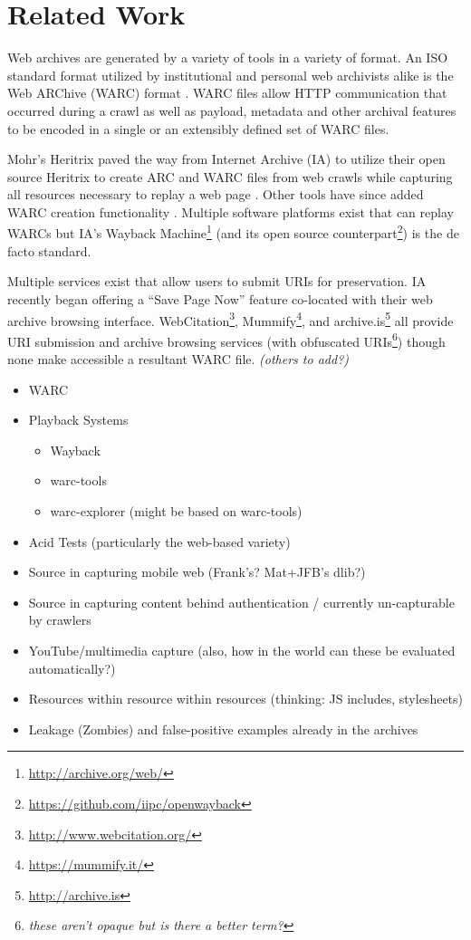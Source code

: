 \documentclass{acm_proc}
\newcommand{\todo}[1]{{\textit{\color{red}#1}}}
\begin{document}
\section{Related Work}


Web archives are generated by a variety of tools in a variety of format. An ISO standard format utilized by institutional and personal web archivists alike is the Web ARChive (WARC) format \cite{isowarc}. WARC files allow HTTP communication that occurred during a crawl as well as payload, metadata and other archival features to be encoded in a single or an extensibly defined set of WARC files.

Mohr's Heritrix paved the way from Internet Archive (IA) to utilize their open source Heritrix to create ARC and WARC files from web crawls while capturing all resources necessary to replay a web page \cite{Heritrix}. Other tools have since added WARC creation functionality \cite{wget-warc,kelly-jcdl2012,warc-proxy}. Multiple software platforms exist that can replay WARCs but IA's Wayback Machine\footnote{\url{http://archive.org/web/}} (and its open source counterpart\footnote{\url{https://github.com/iipc/openwayback}}) is the de facto standard.

Multiple services exist that allow users to submit URIs for preservation. IA recently began offering a ``Save Page Now'' feature co-located with their web archive browsing interface. WebCitation\footnote{\url{http://www.webcitation.org/}}, Mummify\footnote{\url{https://mummify.it/}}, and archive.is\footnote{\url{http://archive.is}} all provide URI submission and archive browsing services (with obfuscated URIs\footnote{\todo{these aren't opaque but is there a better term?}}) though none make accessible a resultant WARC file. \todo{(others to add?)}

\begin{itemize}

\item WARC
\item Playback Systems\begin{itemize}
	\item Wayback
	\item warc-tools
	\item warc-explorer (might be based on warc-tools)
\end{itemize}
\item Acid Tests (particularly the web-based variety)
\item Source in capturing mobile web (Frank's? Mat+JFB's dlib?)
\item Source in capturing content behind authentication / currently un-capturable by crawlers
\item YouTube/multimedia capture (also, how in the world can these be evaluated automatically?)
\item Resources within resource within resources (thinking: JS includes, stylesheets)
\item Leakage (Zombies) and false-positive examples already in the archives
\end{itemize}
\end{document}
